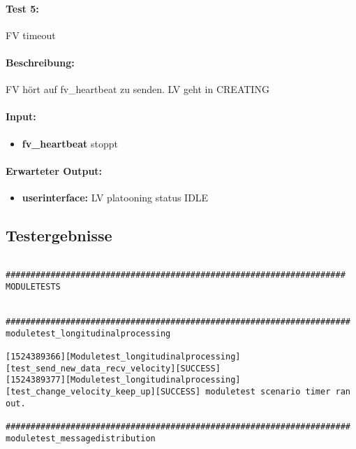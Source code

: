 \documentclass[a4paper, 12pt, titlepage]{scrartcl}
\begin{document}
{			\paragraph{Test 5:}{FV timeout}
			\paragraph{Beschreibung:} FV hört auf fv\_heartbeat zu senden. LV geht in CREATING
			\paragraph{Input:}
			\begin{itemize} \itemsep-0.5em
				\item \textbf{fv\_heartbeat} stoppt
			\end{itemize}

			\paragraph{Erwarteter Output:}
			\begin{itemize} \itemsep-0.5em
				\item \textbf{userinterface:} LV platooning status IDLE
			\end{itemize}

		\subsection{Testergebnisse}
		\label{test_ergebnisse}

		\begin{lstlisting}[basicstyle=\tiny]

####################################################################
MODULETESTS


#####################################################################
moduletest_longitudinalprocessing

[1524389366][Moduletest_longitudinalprocessing][test_send_new_data_recv_velocity][SUCCESS]
[1524389377][Moduletest_longitudinalprocessing][test_change_velocity_keep_up][SUCCESS] moduletest scenario timer ran out.

#####################################################################
moduletest_messagedistribution


\end{lstlisting}}
\end{document}
